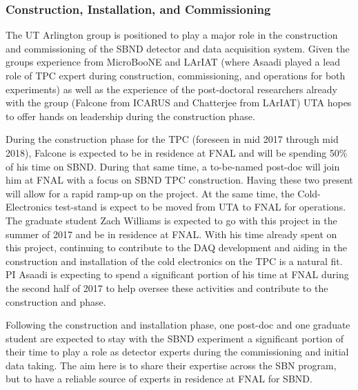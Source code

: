 \subsubsection{Construction, Installation, and Commissioning}\label{sec:SBNDBulid}
The UT Arlington group is positioned to play a major role in the construction and commissioning of the SBND detector and data acquisition system. Given the groups experience from MicroBooNE and LArIAT (where Asaadi played a lead role of TPC expert during construction, commissioning, and operations for both experiments) as well as the experience of the post-doctoral researchers already with the group (Falcone from ICARUS and Chatterjee from LArIAT) UTA hopes to offer hands on leadership during the construction phase.

During the construction phase for the TPC (foreseen in mid 2017 through mid 2018), Falcone is expected to be in residence at FNAL and will be spending 50$\%$ of his time on SBND. During that same time, a to-be-named post-doc will join him at FNAL with a focus on SBND TPC construction. Having these two present will allow for a rapid ramp-up on the project. At the same time, the Cold-Electronics test-stand is expect to be moved from UTA to FNAL for operations. The graduate student Zach Williams is expected to go with this project in the summer of 2017 and be in residence at FNAL. With his time already spent on this project, continuing to contribute to the DAQ development and aiding in the construction and installation of the cold electronics on the TPC is a natural fit. PI Asaadi is expecting to spend a significant portion of his time at FNAL during the second half of 2017 to help oversee these activities and contribute to the construction and phase.

Following the construction and installation phase, one post-doc and one graduate student are expected to stay with the SBND experiment a significant portion of their time to play a role as detector experts during the commissioning and initial data taking. The aim here is to share their expertise across the SBN program, but to have a reliable source of experts in residence at FNAL for SBND. 





